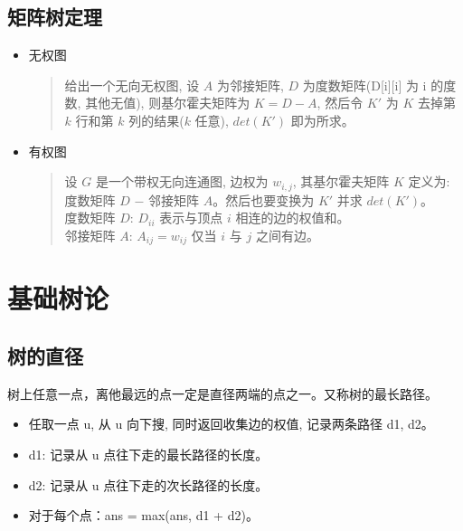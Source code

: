 \documentclass[a4paper,12pt]{article}
\begin{document}
\subsection{矩阵树定理}

\begin{itemize}
    \item 无权图
    \begin{quote}
        给出一个无向无权图, 设 $A$ 为邻接矩阵, $D$ 为度数矩阵(D[i][i] 为 i 的度数, 其他无值),
        则基尔霍夫矩阵为 $K = D - A$, 然后令 $K'$ 为 $K$ 去掉第 $k$ 行和第 $k$ 列的结果($k$ 任意),
        $det(K')$ 即为所求。       
    \end{quote}
    \item 有权图
    \begin{quote}
        设 $G$ 是一个带权无向连通图, 边权为 $w_{i,j}$, 其基尔霍夫矩阵 $K$ 定义为:
        度数矩阵 $D$ $-$ 邻接矩阵 $A$。然后也要变换为 $K'$ 并求 $det(K')$。\\
        
        度数矩阵 $D$: $D_{ii}$ 表示与顶点 $i$ 相连的边的权值和。 \\

        邻接矩阵 $A$: $A_{ij} = w_{ij}$ 仅当 $i$ 与 $j$ 之间有边。
    \end{quote}
\end{itemize}

\newpage

\section{基础树论}

\subsection{树的直径}

\noindent 树上任意一点，离他最远的点一定是直径两端的点之一。又称树的最长路径。

\begin{itemize}
\item 
任取一点 u, 从 u 向下搜, 同时返回收集边的权值, 记录两条路径 d1, d2。

\item 
d1: 记录从 u 点往下走的最长路径的长度。

\item
d2: 记录从 u 点往下走的次长路径的长度。

\item
对于每个点：ans = max({ans, d1 + d2})。
\end{itemize}
\end{document}

